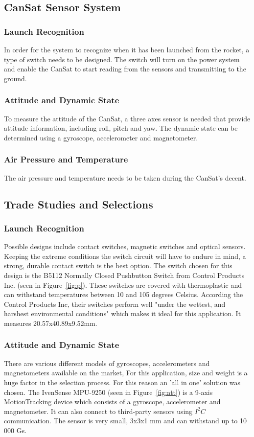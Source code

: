 \documentclass[10pt]{article}
\begin{document}
\subsection{CanSat Sensor System}
\subsubsection{Launch Recognition}
In order for the system to recognize when it has been launched from the rocket, a type of switch needs to be designed.   The switch will turn on the power system and enable the CanSat to start reading from the sensors and transmitting to the ground.
\subsubsection{Attitude and Dynamic State}
To measure the attitude of the CanSat, a three axes sensor is needed that provide attitude information, including roll, pitch and yaw.  The dynamic state can be determined using a gyroscope, accelerometer and magnetometer. 
\subsubsection{Air Pressure and Temperature}
The air pressure and temperature needs to be taken during the CanSat's decent.  
\subsection{Trade Studies and Selections}
\subsubsection{Launch Recognition}
Possible designs include contact switches, magnetic switches and optical sensors.  Keeping the extreme conditions the switch circuit will have to endure in mind, a strong, durable contact switch is the best option.  The switch chosen for this design is the B5112 Normally Closed Pushbutton Switch from Control Products Inc. (seen in Figure~\ref{fig:p}). These switches are covered with thermoplastic and can withstand temperatures between 10 and 105 degrees Celsius.  According the Control Products Inc, their switches perform well "under the wettest, and harshest environmental conditions" which makes it ideal for this application.  It measures 20.57x40.89x9.52mm.
\subsubsection{Attitude and Dynamic State}
There are various different models of gyroscopes, accelerometers and magnetometers available on the market,  For this application, size and weight is a huge factor in the selection process.  For this reason an 'all in one' solution was chosen.  The IvenSense MPU-9250 (seen in Figure~\ref{fig:att}) is a 9-axis MotionTracking device which consists of a gyroscope, accelerometer and magnetometer.  It can also connect to third-party sensors using $I^2C$ communication.  The sensor is very small, 3x3x1 mm and can withstand up to 10 000 Gs.
\end{document}
